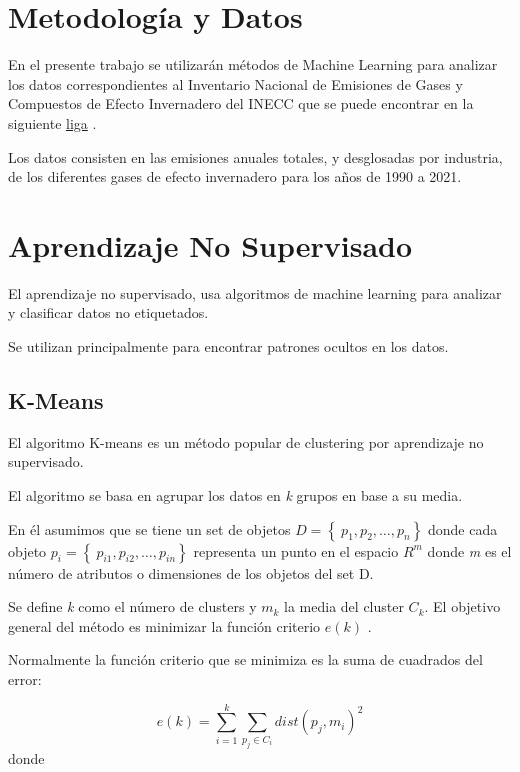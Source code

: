 \documentclass[13.6pt]{article}
\begin{document}
\section{Metodología y Datos} %

En el presente trabajo se utilizarán métodos de Machine Learning para analizar los datos correspondientes al Inventario Nacional de Emisiones de Gases y Compuestos de Efecto Invernadero del INECC que se puede encontrar en la siguiente \href{https://datos.gob.mx/busca/dataset/inventario-nacional-de-emisiones-de-gases-y-compuestos-de-efecto-invernadero-inegycei.}{liga} .

Los datos consisten en las emisiones anuales totales, y desglosadas por industria, de los diferentes gases de efecto invernadero para los años de 1990 a 2021.

\section{Aprendizaje No Supervisado}

El aprendizaje no supervisado, usa algoritmos de machine learning para analizar y clasificar datos no etiquetados. 

Se utilizan principalmente para encontrar patrones ocultos en los datos.

\subsection{K-Means}

El algoritmo K-means es un método popular de clustering por aprendizaje no supervisado.

El algoritmo se basa en agrupar los datos en \textit{k} grupos en base a su media.

En él asumimos que se tiene un set de objetos $D =\left\lbrace\ p_1, p_2, \ldots, p_n \right\rbrace$ donde cada objeto $p_i =\left\lbrace\ p_{i1}, p_{i2}, \ldots, p_{in} \right\rbrace$ representa un punto en el espacio $R^m$ donde \textit{m} es el número de atributos o dimensiones de los objetos del set D. 

Se define \textit{k} como el número de clusters y $m_k$ la media del cluster $C_k$. El objetivo general del método es minimizar la función criterio $e(k)$ . 

Normalmente la función criterio que se minimiza es la suma de cuadrados del error:

\[e(k) = \sum_{i=1}^{k} \sum_{p_j \in C_i}^{} dist(p_j , m_i)^2 \]
donde 
\end{document}

